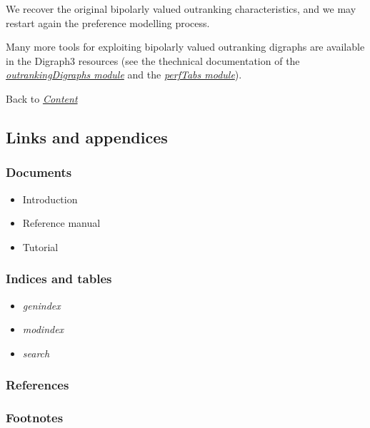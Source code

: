 \documentclass[letterpaper,10pt,english]{sphinxmanual}
\begin{document}
We recover the original bipolarly valued outranking characteristics, and we may restart again the preference modelling process.

Many more tools for exploiting bipolarly valued outranking digraphs are available in the Digraph3 resources (see the thechnical documentation of the {\hyperref[techDoc:outrankingdigraphs-label]{\emph{outrankingDigraphs module}}} and the {\hyperref[techDoc:perftabs-label]{\emph{perfTabs module}}}).

Back to {\hyperref[tutorial:tutorial-label]{\emph{Content}}}


\subsection{Links and appendices}
\label{tutorial:links-and-appendices}

\subsubsection{Documents}
\label{tutorial:documents}\begin{itemize}
\item {} 
Introduction

\item {} 
Reference manual

\item {} 
Tutorial

\end{itemize}


\subsubsection{Indices and tables}
\label{tutorial:indices-and-tables}\begin{itemize}
\item {} 
\emph{genindex}

\item {} 
\emph{modindex}

\item {} 
\emph{search}

\end{itemize}


\subsubsection{References}
\label{tutorial:references}

\subsubsection{Footnotes}
\label{tutorial:footnotes}
\end{document}
